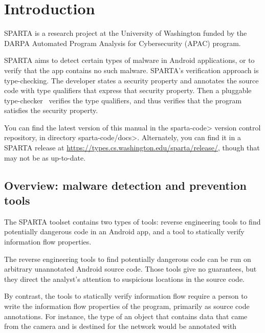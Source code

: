 \htmlhr
\chapter{Introduction\label{introduction}}

SPARTA is a research project at the University of Washington funded by the DARPA
 Automated Program Analysis for Cybersecurity (APAC) program.


SPARTA aims to detect certain types of malware in Android applications, or
to verify that the app contains no such malware.  SPARTA's verification
approach is type-checking.  The developer states a security property and
annotates the source code with type qualifiers that express that security
property. Then a pluggable type-checker~\cite{PapiACPE2008,DietlDEMS2011} verifies the type
qualifiers, and thus verifies that the program satisfies the security
property.




You can find the latest version of this manual in the \<sparta-code> version
control repository, in directory \<sparta-code/docs>.  Alternately, you can
find it in a SPARTA release at
\url{https://types.cs.washington.edu/sparta/release/}, though that may not
be as up-to-date.


\section{Overview:  malware detection and prevention tools}

The SPARTA toolset contains two types of tools:  reverse engineering tools to find potentially
dangerous code in an Android app, and a tool to statically verify
information flow properties.

The reverse engineering tools to find potentially dangerous code can be run on
arbitrary unannotated Android source code.  Those tools give no guarantees,
but they direct the analyst's attention to suspicious locations
in the source code.

By contrast, the tools to statically verify information flow require a person to write
the information flow properties of the program, primarily as source code
annotations.  For instance, the type of an object  that contains data that came from the
camera and is destined for the network would be annotated with 

